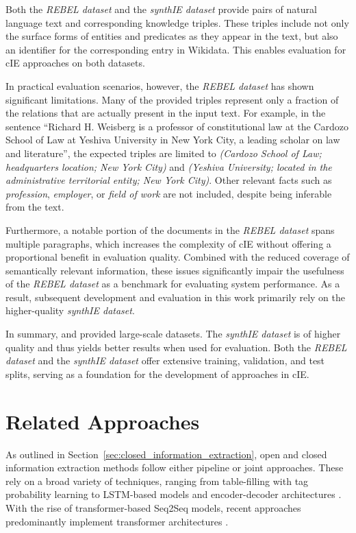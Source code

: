 \documentclass[a4paper,oneside,bibliography=totoc]{scrbook}
\begin{document}
Both the \textit{REBEL dataset} and the \textit{synthIE dataset} provide pairs of natural language text and corresponding knowledge triples. These triples include not only the surface forms of entities and predicates as they appear in the text, but also an identifier for the corresponding entry in Wikidata. This enables evaluation for \ac{cIE} approaches on both datasets.

In practical evaluation scenarios, however, the \textit{REBEL dataset} has shown significant limitations. Many of the provided triples represent only a fraction of the relations that are actually present in the input text. For example, in the sentence \enquote{Richard H. Weisberg is a professor of constitutional law at the Cardozo School of Law at Yeshiva University in New York City, a leading scholar on law and literature}, the expected triples are limited to \textit{(Cardozo School of Law; headquarters location; New York City)} and \textit{(Yeshiva University; located in the administrative territorial entity; New York City)}. Other relevant facts such as \textit{profession}, \textit{employer}, or \textit{field of work} are not included, despite being inferable from the text.

Furthermore, a notable portion of the documents in the \textit{REBEL dataset} spans multiple paragraphs, which increases the complexity of \ac{cIE} without offering a proportional benefit in evaluation quality. Combined with the reduced coverage of semantically relevant information, these issues significantly impair the usefulness of the \textit{REBEL dataset} as a benchmark for evaluating system performance. As a result, subsequent development and evaluation in this work primarily rely on the higher-quality \textit{synthIE dataset}.

In summary, \citet{HuguetCabot2021} and \citet{Josifoski2023} provided large-scale datasets. The \textit{synthIE dataset} is of higher quality and thus yields better results when used for evaluation. Both the \textit{REBEL dataset} and the \textit{synthIE dataset} offer extensive training, validation, and test splits, serving as a foundation for the development of approaches in \ac{cIE}.

\section{Related Approaches}
\label{sec:related_approaches}

As outlined in Section~\ref{sec:closed_information_extraction}, open and closed information extraction methods follow either pipeline or joint approaches. These rely on a broad variety of techniques, ranging from table-filling with tag probability learning to LSTM-based models and encoder-decoder architectures \cite{Zhang2022,Angeli2015,Trisedya2019}. With the rise of transformer-based Seq2Seq models, recent approaches predominantly implement transformer architectures \cite{Josifoski2021,Josifoski2023,Moeller2024}.
\end{document}
